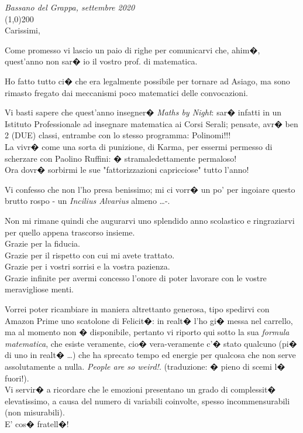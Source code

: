 \documentclass[10pt]{article}
\begin{document}
\pagestyle{empty}
\onehalfspacing
\emph{Bassano del Grappa, settembre 2020}\\
\line(1,0){200}\\

Carissimi,

Come promesso vi lascio un paio di righe per comunicarvi che, ahim�, quest'anno non sar� io il vostro prof. di matematica.

Ho fatto tutto ci� che era legalmente possibile per tornare ad Asiago, ma sono rimasto fregato dai meccanismi poco matematici delle convocazioni.

Vi basti sapere che quest'anno insegner� {\em Maths by Night}: sar� infatti in un Istituto Professionale ad insegnare matematica ai Corsi Serali; pensate, avr� ben 2 (DUE) classi, entrambe con lo stesso programma: Polinomi!!!\\
La vivr� come una sorta di punizione, di Karma, per essermi permesso di scherzare con Paolino Ruffini: � stramaledettamente permaloso!\\ Ora dovr� sorbirmi le sue "fattorizzazioni capricciose" tutto l'anno!

Vi confesso che non l'ho presa benissimo; mi ci vorr� un po' per ingoiare questo brutto rospo - un {\em Incilius Alvarius} almeno \dots -.

Non mi rimane quindi che augurarvi uno splendido anno scolastico e ringraziarvi per quello appena trascorso insieme.\\
Grazie per la fiducia.\\
Grazie per il rispetto con cui mi avete trattato.\\
Grazie per i vostri sorrisi e la vostra pazienza.\\
Grazie infinite per avermi concesso l'onore di poter lavorare con le vostre meravigliose menti.

Vorrei poter ricambiare in maniera altrettanto generosa, tipo spedirvi con Amazon Prime uno scatolone di Felicit�: in realt� l'ho gi� messa nel carrello, ma al momento non � disponibile, pertanto vi riporto qui sotto la sua {\em formula matematica}, che esiste veramente, cio� vera-veramente c'� stato qualcuno (pi� di uno in realt� \dots) che ha sprecato tempo ed energie per qualcosa che non serve assolutamente a nulla.
{\em People are so weird!}. (traduzione: � pieno di scemi l� fuori!).\\

Vi servir� a ricordare che le emozioni presentano un grado di complessit� elevatissimo, a causa del numero di variabili coinvolte, spesso incommensurabili (non misurabili).\\
E' cos� fratell�!
\end{document}

